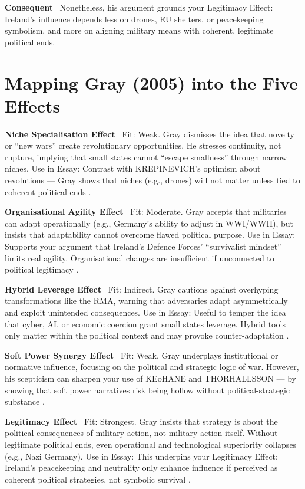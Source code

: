 \textbf{Consequent} \
Nonetheless, his argument grounds your Legitimacy Effect: Ireland’s influence depends less on drones, EU shelters, or peacekeeping symbolism, and more on aligning military means with coherent, legitimate political ends.

\section*{Mapping Gray (2005) into the Five Effects}

\textbf{Niche Specialisation Effect} \
Fit: Weak. Gray dismisses the idea that novelty or “new wars” create revolutionary opportunities. He stresses continuity, not rupture, implying that small states cannot “escape smallness” through narrow niches.
Use in Essay: Contrast with KREPINEVICH’s optimism about revolutions — Gray shows that niches (e.g., drones) will not matter unless tied to coherent political ends \parencite{GRAY_2005}.

\textbf{Organisational Agility Effect} \
Fit: Moderate. Gray accepts that militaries can adapt operationally (e.g., Germany’s ability to adjust in WWI/WWII), but insists that adaptability cannot overcome flawed political purpose.
Use in Essay: Supports your argument that Ireland’s Defence Forces’ “survivalist mindset” limits real agility. Organisational changes are insufficient if unconnected to political legitimacy \parencite{GRAY_2005}.

\textbf{Hybrid Leverage Effect} \
Fit: Indirect. Gray cautions against overhyping transformations like the RMA, warning that adversaries adapt asymmetrically and exploit unintended consequences.
Use in Essay: Useful to temper the idea that cyber, AI, or economic coercion grant small states leverage. Hybrid tools only matter within the political context and may provoke counter-adaptation \parencite{GRAY_2005}.

\textbf{Soft Power Synergy Effect} \
Fit: Weak. Gray underplays institutional or normative influence, focusing on the political and strategic logic of war. However, his scepticism can sharpen your use of KEoHANE and THORHALLSSON — by showing that soft power narratives risk being hollow without political-strategic substance \parencite{GRAY_2005}.

\textbf{Legitimacy Effect} \
Fit: Strongest. Gray insists that strategy is about the political consequences of military action, not military action itself. Without legitimate political ends, even operational and technological superiority collapses (e.g., Nazi Germany).
Use in Essay: This underpins your Legitimacy Effect: Ireland’s peacekeeping and neutrality only enhance influence if perceived as coherent political strategies, not symbolic survival \parencite{GRAY_2005}.

